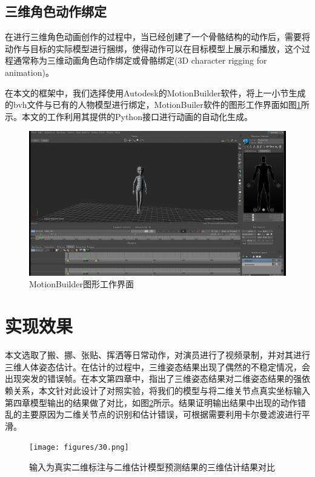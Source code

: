 \subsection{三维角色动作绑定}{}
在进行三维角色动画创作的过程中，当已经创建了一个骨骼结构的动作后，需要将动作与目标的实际模型进行捆绑，使得动作可以在目标模型上展示和播放，这个过程通常称为三维动画角色动作绑定或骨骼绑定(3D character rigging for animation)。

在本文的框架中，我们选择使用Autodesk的MotionBuilder软件，将上一小节生成的bvh文件与已有的人物模型进行绑定，MotionBuiler软件的图形工作界面如图\ref{fig:f28}所示。本文的工作利用其提供的Python接口进行动画的自动化生成。

\begin{figure}[h]
	\centering
	\includegraphics[scale=0.3]{figures/28.png}
	\caption{MotionBuilder图形工作界面}
	\label{fig:f28}
\end{figure}


\section{实现效果}

本文选取了搬、挪、张贴、挥洒等日常动作，对演员进行了视频录制，并对其进行三维人体姿态估计。在估计的过程中，三维姿态结果出现了偶然的不稳定情况，会出现突发的错误帧。在本文第四章中，指出了三维姿态结果对二维姿态结果的强依赖关系，本文针对此设计了对照实验，将我们的模型与将二维关节点真实坐标输入第四章模型输出的结果做了对比，如图\ref{fig:f30}所示。结果证明输出结果中出现的动作错乱的主要原因为二维关节点的识别和估计错误，可根据需要利用卡尔曼滤波进行平滑。

\begin{figure}[h]
	\centering
	\texttt{[image: figures/30.png]}
	\caption{输入为真实二维标注与二维估计模型预测结果的三维估计结果对比}
	\label{fig:f30}
\end{figure}


